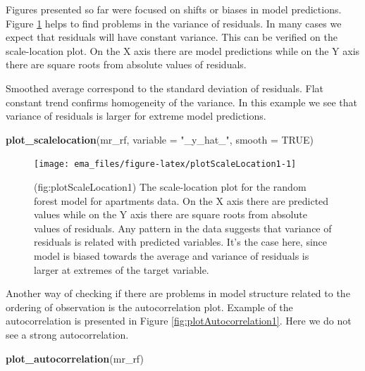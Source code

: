 \documentclass[12pt,]{krantz}
\newenvironment{Shaded}{\begin{snugshade}}{\end{snugshade}}
\newcommand{\DataTypeTok}[1]{\textcolor[rgb]{0.13,0.29,0.53}{#1}}
\newcommand{\KeywordTok}[1]{\textcolor[rgb]{0.13,0.29,0.53}{\textbf{#1}}}
\newcommand{\NormalTok}[1]{#1}
\newcommand{\OtherTok}[1]{\textcolor[rgb]{0.56,0.35,0.01}{#1}}
\newcommand{\StringTok}[1]{\textcolor[rgb]{0.31,0.60,0.02}{#1}}
\begin{document}
Figures presented so far were focused on shifts or biases in model predictions.
Figure \ref{fig:plotScaleLocation1} helps to find problems in the variance of residuals. In many cases we expect that residuals will have constant variance. This can be verified on the scale-location plot. On the X axis there are model predictions while on the Y axis there are square roots from absolute values of residuals.

Smoothed average correspond to the standard deviation of residuals. Flat constant trend confirms homogeneity of the variance. In this example we see that variance of residuals is larger for extreme model predictions.

\begin{Shaded}
\begin{Highlighting}[]
\KeywordTok{plot_scalelocation}\NormalTok{(mr_rf, }\DataTypeTok{variable =} \StringTok{"_y_hat_"}\NormalTok{, }\DataTypeTok{smooth =} \OtherTok{TRUE}\NormalTok{)}
\end{Highlighting}
\end{Shaded}

\begin{figure}

{\centering \texttt{[image: ema\_files/figure-latex/plotScaleLocation1-1]} 

}

\caption{(fig:plotScaleLocation1) The scale-location plot for the random forest model for apartments data. On the X axis there are predicted values while on the Y axis there are square roots from absolute values of residuals. Any pattern in the data suggests that variance of residuals is related with predicted variables. It's the case here, since model is biased towards the average and variance of residuals is larger at extremes of the target variable.}\label{fig:plotScaleLocation1}
\end{figure}

Another way of checking if there are problems in model structure related to the ordering of observation is the autocorrelation plot. Example of the autocorrelation is presented in Figure \ref{fig:plotAutocorrelation1}. Here we do not see a strong autocorrelation.

\begin{Shaded}
\begin{Highlighting}[]
\KeywordTok{plot_autocorrelation}\NormalTok{(mr_rf)}
\end{Highlighting}
\end{Shaded}
\end{document}
